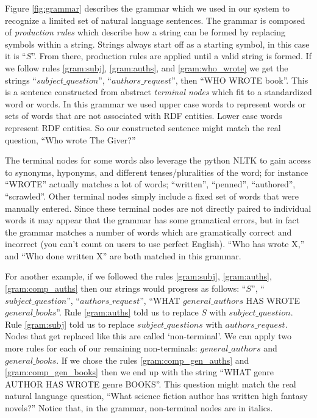 \documentclass[11pt]{article}
\begin{document}
{Figure \ref{fig:grammar} describes the grammar which we used in our system to recognize
a limited set of natural language sentences. The grammar is composed of {\em production
rules} which describe how a string can be formed by replacing symbols within a
string. Strings always start off as a starting symbol, in this case it is ``$S$''. From 
there, production rules are applied until a valid string is formed. If we follow rules 
\ref{gram:subj}, \ref{gram:auths}, and \ref{gram:who_wrote} we get the strings 
``$subject\_question$'', ``$authors\_request$'', then ``WHO WROTE book''. This is a sentence
constructed from abstract {\em terminal nodes} which fit to a standardized word or words.
In this grammar we used upper case words to represent words or sets of words that are 
not associated with RDF entities. Lower case words represent RDF entities. 
So our constructed sentence might match the real question, ``Who wrote The Giver?''

The terminal nodes for some words also leverage the python NLTK\cite{nltk} to gain access 
to synonyms, hyponyms, and different tenses/pluralities of the word; 
for instance ``WROTE'' actually matches a lot of words; 
``written'', ``penned'', ``authored'', ``scrawled''. Other terminal nodes
simply include a fixed set of words that were manually entered.
Since these terminal nodes are not directly paired to individual words it may appear that
the grammar has some gramatical errors, but in fact the grammar matches a number of
words which are gramatically correct and incorrect (you can't count on users to use
perfect English). ``Who has wrote X,'' and ``Who done written X'' are both matched in this
grammar.

For another example, if we followed the rules \ref{gram:subj}, \ref{gram:auths}, 
\ref{gram:comp_auths} then our strings would progress as follows: 
``$S$'', ``$subject\_question$'', ``$authors\_request$'', 
``WHAT $general\_authors$ HAS WROTE $general\_books$''. Rule \ref{gram:auths} told us to 
replace $S$ with $subject\_question$. Rule \ref{gram:subj} told us to replace
$subject\_questions$ with $authors\_request$. Nodes that get replaced like this
are called `non-terminal'. We can apply two more rules for each of our remaining
non-terminals: $general\_authors$ and $general\_books$. If we chose the rules
\ref{gram:comp_gen_auths} and \ref{gram:comp_gen_books} then we end up with the
string ``WHAT genre AUTHOR HAS WROTE genre BOOKS''. This question might match the
real natural language question, ``What science fiction author has written 
high fantasy novels?'' Notice that, in the grammar, non-terminal nodes are
in italics.

}
\end{document}

